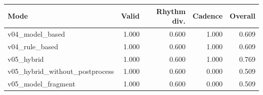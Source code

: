 \begin{tabular}{lrrrr}
\toprule
Mode & Valid & Rhythm div. & Cadence & Overall \\
\midrule
v04_model_based & 1.000 & 0.600 & 1.000 & 0.609 \\
v04_rule_based & 1.000 & 0.600 & 1.000 & 0.609 \\
v05_hybrid & 1.000 & 0.600 & 1.000 & 0.769 \\
v05_hybrid_without_postprocess & 1.000 & 0.600 & 0.000 & 0.509 \\
v05_model_fragment & 1.000 & 0.600 & 0.000 & 0.509 \\
\bottomrule
\end{tabular}
